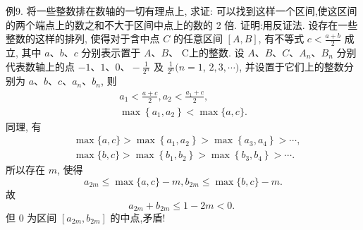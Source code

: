 例9. 将一些整数排在数轴的一切有理点上, 求证: 可以找到这样一个区间,使这区间的两个端点上的数之和不大于区间中点上的数的 2 倍.
证明:用反证法.
设存在一些整数的这样的排列, 使得对于含中点 $C$ 的任意区间 $[A, B]$, 有不等式 $c<\frac{a+b}{2}$ 成立, 其中 $a 、 b 、 c$ 分别表示置于 $A 、 B 、$ C上的整数.
设 $A 、 B 、 C 、 A_n 、 B_n$ 分别代表数轴上的点 $-1 、 1 、 0 、-\frac{1}{2^n}$ 及 $\frac{1}{2^n}(n=1$, $2,3, \cdots)$, 并设置于它们上的整数分别为 $a 、 b 、 c 、 a_n 、 b_n$,
则
$$
\begin{array}{r}
a_1<\frac{a+c}{2}, a_2<\frac{a_1+c}{2}, \\
\max \left\{a_1, a_2\right\}<\max \{a, c\} .
\end{array}
$$
同理, 有
$$
\begin{aligned}
& \max \{a, c\}>\max \left\{a_1, a_2\right\}>\max \left\{a_3, a_4\right\}>\cdots, \\
& \max \{b, c\}>\max \left\{b_1, b_2\right\}>\max \left\{b_3, b_4\right\}>\cdots .
\end{aligned}
$$
所以存在 $m$, 使得
$$
a_{2 m} \leqslant \max \{a, c\}-m, b_{2 m} \leqslant \max \{b, c\}-m .
$$
故
$$
a_{2 m}+b_{2 m} \leqslant 1-2 m<0 \text {. }
$$
但 0 为区间 $\left[a_{2 m}, b_{2 m}\right]$ 的中点,矛盾!



